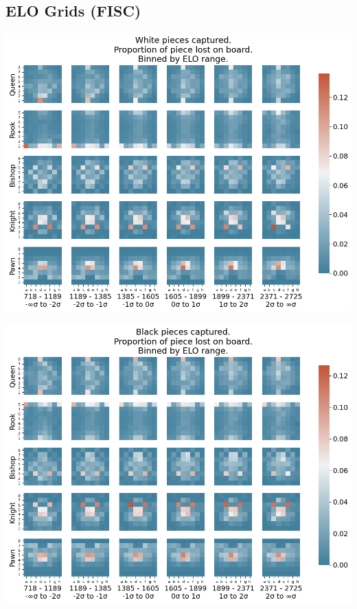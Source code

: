 \documentclass[11pt]{article}
\begin{document}
\subsection{ELO Grids (FISC)}
\label{sec:org3c5061c}
\begin{center}
\includegraphics[width=\textwidth]{Images/_HEATMAP_Queen_Rook_Bishop_Knight_Pawn_WHITE_ELO_FISC.png}
\end{center}

\begin{center}
\includegraphics[width=\textwidth]{Images/_HEATMAP_Queen_Rook_Bishop_Knight_Pawn_BLACK_ELO_FISC.png}
\end{center}
\end{document}
